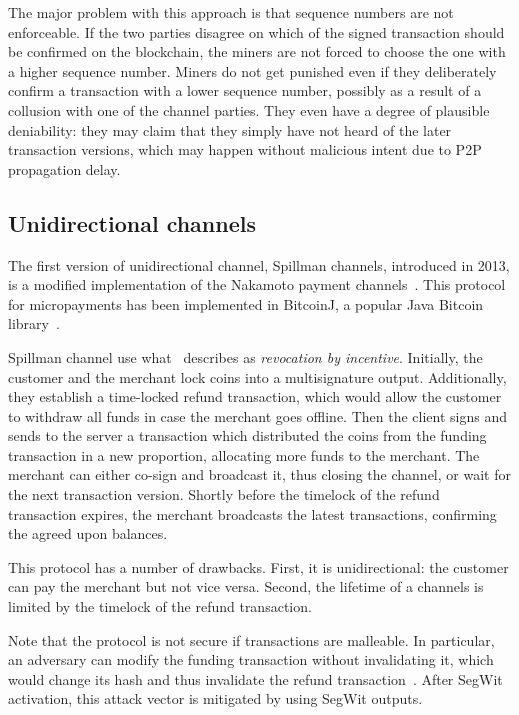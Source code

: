 The major problem with this approach is that sequence numbers are not enforceable.
If the two parties disagree on which of the signed transaction should be confirmed on the blockchain, the miners are not forced to choose the one with a higher sequence number.
Miners do not get punished even if they deliberately confirm a transaction with a lower sequence number, possibly as a result of a collusion with one of the channel parties.
They even have a degree of plausible deniability: they may claim that they simply have not heard of the later transaction versions, which may happen without malicious intent due to P2P propagation delay.


\subsection{Unidirectional channels}

The first version of unidirectional channel, Spillman channels, introduced in 2013, is a modified implementation of the Nakamoto payment channels~\cite{Spillman2013}.
This protocol for micropayments has been implemented in BitcoinJ, a popular Java Bitcoin library~\cite{BitcoinJ}.

Spillman channel use what~\cite{Gudgeon2019} describes as \textit{revocation by incentive}.
Initially, the customer and the merchant lock coins into a multisignature output.
Additionally, they establish a time-locked refund transaction, which would allow the customer to withdraw all funds in case the merchant goes offline.
Then the client signs and sends to the server a transaction which distributed the coins from the funding transaction in a new proportion, allocating more funds to the merchant.
The merchant can either co-sign and broadcast it, thus closing the channel, or wait for the next transaction version.
Shortly before the timelock of the refund transaction expires, the merchant broadcasts the latest transactions, confirming the agreed upon balances.

This protocol has a number of drawbacks.
First, it is unidirectional: the customer can pay the merchant but not vice versa.
Second, the lifetime of a channels is limited by the timelock of the refund transaction.

Note that the protocol is not secure if transactions are malleable.
In particular, an adversary can modify the funding transaction without invalidating it, which would change its hash and thus invalidate the refund transaction~\cite{Harding2016}.
After SegWit activation, this attack vector is mitigated by using SegWit outputs.

